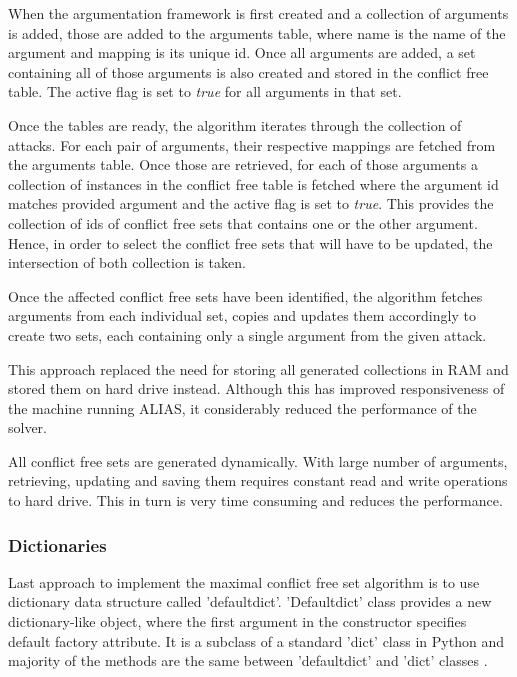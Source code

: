 When the argumentation framework is first created and a collection of arguments is added, those are added to the arguments table, where name is the name of the argument and mapping is its unique id. Once all arguments are added, a set containing all of those arguments is also created and stored in the conflict free table. The active flag is set to \textit{true} for all arguments in that set.

Once the tables are ready, the algorithm iterates through the collection of attacks. For each pair of arguments, their respective mappings are fetched from the arguments table. Once those are retrieved, for each of those arguments a collection of instances in the conflict free table is fetched where the argument id matches provided argument and the active flag is set to \textit{true}. This provides the collection of ids of conflict free sets that contains one or the other argument. Hence, in order to select the conflict free sets that will have to be updated, the intersection of both collection is taken.

Once the affected conflict free sets have been identified, the algorithm fetches arguments from each individual set, copies and updates them accordingly to create two sets, each containing only a single argument from the given attack.

This approach replaced the need for storing all generated collections in RAM and stored them on hard drive instead. Although this has improved responsiveness of the machine running ALIAS, it considerably reduced the performance of the solver. 

All conflict free sets are generated dynamically. With large number of arguments, retrieving, updating and saving them requires constant read and write operations to hard drive. This in turn is very time consuming and reduces the performance.

\subsubsection{Dictionaries}\label{sec:dicts}
Last approach to implement the maximal conflict free set algorithm is to use dictionary data structure called 'defaultdict'. 'Defaultdict' class provides a new dictionary-like object, where the first argument in the constructor specifies default factory attribute. It is a subclass of a standard 'dict' class in Python and majority of the methods are the same between 'defaultdict' and 'dict' classes \citep{defaultdict}.

